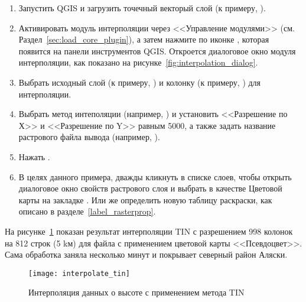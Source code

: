 \label{interpolation_usage}

\begin{enumerate}
  \item Запустить QGIS и загрузить точечный векторый слой (к примеру,
  ).
  \item Активировать модуль интерполяции через <<Управление модулями>>
  (см. Раздел~\ref{sec:load_core_plugin}), а затем нажмите по иконке
  , которая появится на панели
  инструментов QGIS. Откроется диалоговое окно модуля интерполяции, как
  показано на рисунке~\ref{fig:interpolation_dialog}.
  \item Выбрать исходный слой (к примеру, )
  и колонку (к примеру, ) для интерполяции.
  \item Выбрать метод интеполяции (например,
  ) и установить <<Разрешение по Х>>
  и <<Разрешение по Y>> равным 5000, а также задать название растрового
  файла вывода (например, ).
  \item Нажать .
  \item В целях данного примера, дважды кликнуть 
  в списке слоев, чтобы открыть диалоговое окно свойств растрового слоя
  и выбрать  в качестве Цветовой
  карты на закладке . Или же определить новую таблицу
  раскраски, как описано в разделе~\ref{label_rasterprop}.
\end{enumerate}

На рисунке~\ref{fig:interpolation_idw} показан результат интерполяции
TIN с разрешением 998 колонок на 812 строк (5 kм) для файла
 с применением цветовой карты <<Псевдоцвет>>. Сама
обработка заняла несколько минут и покрывает северный район Аляски.

\begin{figure}[ht]
   \centering
   \texttt{[image: interpolate\_tin]}
   \caption{Интерполяция данных о высоте с применением метода TIN \wincaption}\label{fig:interpolation_idw}
\end{figure}

\FloatBarrier
